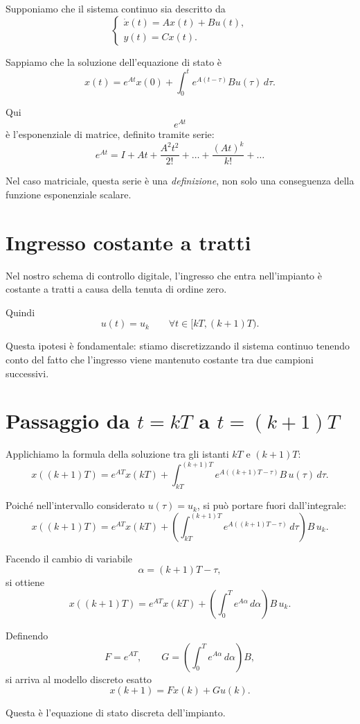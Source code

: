 Supponiamo che il sistema continuo sia descritto da
\[
\begin{cases}
\dot x(t)=Ax(t)+Bu(t),\\[4pt]
y(t)=Cx(t).
\end{cases}
\]

Sappiamo che la soluzione dell'equazione di stato \`e
\[
x(t)=e^{At}x(0)+\int_0^t e^{A(t-\tau)}Bu(\tau)\,d\tau.
\]

Qui
\[
e^{At}
\]
\`e l'esponenziale di matrice, definito tramite serie:
\[
e^{At}=I+At+\frac{A^2t^2}{2!}+\dots+\frac{(At)^k}{k!}+\dots
\]

Nel caso matriciale, questa serie \`e una \emph{definizione}, non solo una conseguenza
della funzione esponenziale scalare.

\section{Ingresso costante a tratti}

Nel nostro schema di controllo digitale, l'ingresso che entra nell'impianto
\`e costante a tratti a causa della tenuta di ordine zero.

Quindi
\[
u(t)=u_k
\qquad
\forall t\in[kT,(k+1)T).
\]

Questa ipotesi \`e fondamentale:
stiamo discretizzando il sistema continuo tenendo conto del fatto che
l'ingresso viene mantenuto costante tra due campioni successivi.

\section{Passaggio da \(t=kT\) a \(t=(k+1)T\)}

Applichiamo la formula della soluzione tra gli istanti \(kT\) e \((k+1)T\):
\[
x((k+1)T)=e^{AT}x(kT)+\int_{kT}^{(k+1)T} e^{A((k+1)T-\tau)}B\,u(\tau)\,d\tau.
\]

Poich\'e nell'intervallo considerato \(u(\tau)=u_k\), si pu\`o portare fuori dall'integrale:
\[
x((k+1)T)=e^{AT}x(kT)+\left(\int_{kT}^{(k+1)T} e^{A((k+1)T-\tau)}\,d\tau\right)B\,u_k.
\]

Facendo il cambio di variabile
\[
\alpha=(k+1)T-\tau,
\]
si ottiene
\[
x((k+1)T)=e^{AT}x(kT)+\left(\int_0^T e^{A\alpha}\,d\alpha\right)B\,u_k.
\]

Definendo
\[
F=e^{AT},
\qquad
G=\left(\int_0^T e^{A\alpha}\,d\alpha\right)B,
\]
si arriva al modello discreto esatto
\[
x(k+1)=Fx(k)+Gu(k).
\]

Questa \`e l'equazione di stato discreta dell'impianto.

